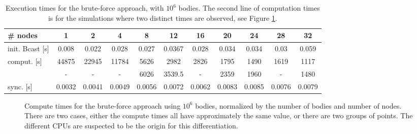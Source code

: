 \begin{table}
  \begin{adjustwidth}{-1.5cm}{-1.5cm}   
    \centering
    \begin{tabular}{l|cccccccccc}
      \# nodes & 1 & 2 & 4 & 8 & 12 & 16 & 20 & 24 & 28 & 32\\
      \hline init. Bcast [s] & 0.008 & 0.022 & 0.028 & 0.027 & 0.0367 & 0.028 & 0.034 & 0.034 & 0.03 & 0.059\\
      comput. [s] & 44875 & 22945 & 11784 & 5626 & 2982 & 2826 & 1795 & 1490 & 1619 & 1117\\
      & - & - & - & 6026 & 3539.5 & - & 2359 & 1960 & - & 1480\\
      sync. [s] & 0.0032 & 0.0041 & 0.0049 & 0.0056 & 0.0072 & 0.0062 & 0.0083 & 0.0085 & 0.0076& 0.0079\\
    \end{tabular}
    \caption{Execution times for the brute-force approach, with $10^6$ bodies. The second line of computation times is for the simulations where two distinct times are observed, see Figure \ref{fig:bf:computeTimes}.}
    \label{tab:bf:10e6}
  \end{adjustwidth}
\end{table}

\begin{figure}
\centering

\caption{Compute times for the brute-force approach using $10^6$ bodies, normalized by the number of bodies and number of nodes. There are two cases, either the compute times all have approximately the same value, or there are two groups of points. The different CPUs are suspected to be the origin for this differentiation.}
\label{fig:bf:computeTimes}
\end{figure}

